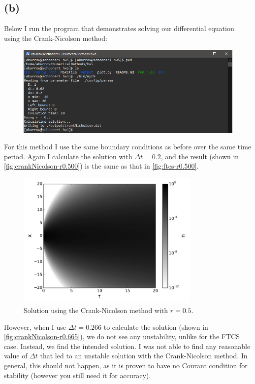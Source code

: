 \documentclass[12pt]{article}
\begin{document}
\subsection*{(b)}

Below I run the program that demonstrates solving our differential equation
using the Crank-Nicolson method:
\begin{figure}[H]
    \centering
    \includegraphics[width=1\textwidth]{myCN}
    \label{fig:myCN}
\end{figure}

For this method I use the same boundary conditions as before over the same time
period. Again I calculate the solution with $\Delta t = 0.2$, and the result
(shown in \autoref{fig:crankNicolson-r0.500}) is the same as that in
\autoref{fig:ftcs-r0.500}.

\begin{figure}[ht]
    \centering
    \includegraphics[width=0.8\textwidth]{crankNicolson-r0.500}
    \caption{Solution using the Crank-Nicolson method with $r = 0.5$.}
    \label{fig:crankNicolson-r0.500}
\end{figure}

However, when I use $\Delta t = 0.266$ to calculate the solution (shown in
\autoref{fig:crankNicolson-r0.665}), we do not see any unstability, unlike
for the FTCS case. Instead, we find the intended solution. I was not able to
find any reasonable value of $\Delta t$ that led to an unstable solution with
the Crank-Nicolson method. In general, this should not happen, as it is proven
to have no Courant condition for stability (however you still need it for
accuracy).
\end{document}
